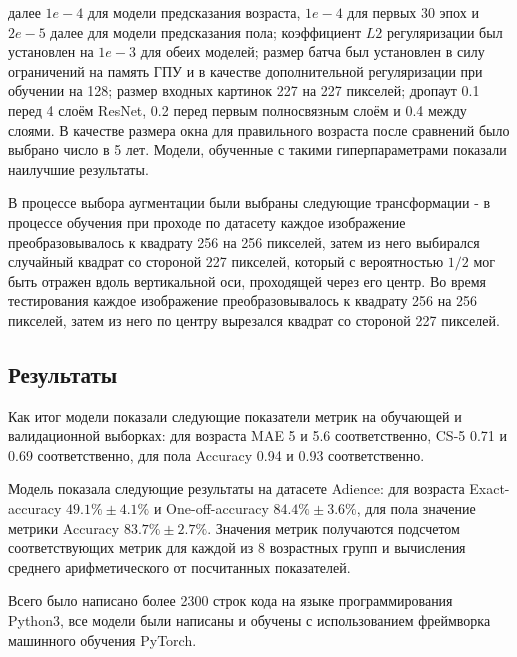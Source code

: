 далее $1e-4$ для модели предсказания возраста, $1e-4$ для первых 30 эпох и $2e-5$ далее для модели предсказания пола;
коэффициент $L2$ регуляризации был установлен на $1e-3$ для обеих моделей;
размер батча был установлен в силу ограничений на память ГПУ и в качестве дополнительной регуляризации при обучении на 128;
размер входных картинок 227 на 227 пикселей;
дропаут 0.1 перед 4 слоём ResNet, 0.2 перед первым полносвязным слоём и 0.4 между слоями.
В качестве размера окна для правильного возраста после сравнений было выбрано число в 5 лет.
Модели, обученные с такими гиперпараметрами показали наилучшие результаты.
\par В процессе выбора аугментации были выбраны следующие трансформации -
в процессе обучения при проходе по датасету каждое изображение преобразовывалось к квадрату 256 на 256 пикселей,
затем из него выбирался случайный квадрат со стороной 227 пикселей,
который с вероятностью $1/2$ мог быть отражен вдоль вертикальной оси, проходящей через его центр.
Во время тестирования каждое изображение преобразовывалось к квадрату 256 на 256 пикселей,
затем из него по центру вырезался квадрат со стороной 227 пикселей.

\subsection{Результаты}\label{subsec:результаты}
Как итог модели показали следующие показатели метрик на обучающей и валидационной выборках: для возраста MAE 5 и 5.6 соответственно,
CS-5 0.71 и 0.69 соответственно, для пола Accuracy 0.94 и 0.93 соответственно.
\par Модель показала следующие результаты на датасете Adience: для возраста Exact-accuracy $49.1\% \pm 4.1 \%$ и One-off-accuracy $84.4\% \pm 3.6 \%$,
для пола значение метрики Accuracy $83.7\% \pm 2.7\%$.
Значения метрик получаются подсчетом соответствующих метрик для каждой из 8 возрастных групп
и вычисления среднего арифметического от посчитанных показателей.
\par Всего было написано более 2300 строк кода на языке программирования Python3,
все модели были написаны и обучены с использованием фреймворка машинного обучения PyTorch.
\newpage

